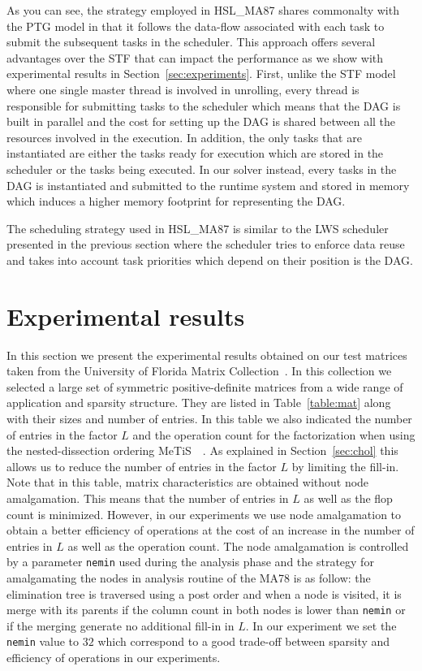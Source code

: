 \documentclass{article}
\newcommand{\alert}[1]{\textcolor{red}{#1}\xspace}
\newcommand{\ma}{HSL\_MA87\xspace}
\newcommand{\lsection}[1]{\section{#1} \setcounter{equation}{0} \setcounter{figure}{0} \setcounter{table}{0} \label{#1}}
\newcommand{\metis}{{\sc Me$\!$T$\!$iS\ }}
\begin{document}
As you can see, the strategy employed in \ma shares commonalty with
the PTG model in that it follows the data-flow associated with each
task to submit the subsequent tasks in the scheduler. This approach
offers several advantages over the STF that can impact the performance
as we show with experimental results in
Section~\ref{sec:experiments}. First, unlike the STF model where one
single master thread is involved in unrolling, every thread is
responsible for submitting tasks to the scheduler which means that the
DAG is built in parallel and the cost for setting up the DAG is shared
between all the resources involved in the execution. In addition, the
only tasks that are instantiated are either the tasks ready for
execution which are stored in the scheduler or the tasks being
executed. In our solver instead, every tasks in the DAG is
instantiated and submitted to the runtime system and stored in memory
which induces a higher memory footprint for representing the DAG.

The scheduling strategy used in \ma is similar to the LWS scheduler
presented in the previous section where the scheduler tries to enforce
data reuse and takes into account task priorities which depend on
their position is the DAG.


\lsection{Experimental results}\label{sec:experiments}

In this section we present the experimental results obtained on our
test matrices taken from the University of Florida Matrix
Collection~\cite{d.h:11}. In this collection we selected a large set
of symmetric positive-definite matrices from a wide range of
application and sparsity structure. They are listed in
Table~\ref{table:mat} along with their sizes and number of entries. In
this table we also indicated the number of entries in the factor $L$
and the operation count for the factorization when using the
nested-dissection ordering \metis~\cite{k.k:98}. As explained in
Section~\ref{sec:chol} this allows us to reduce the number of entries
in the factor $L$ by limiting the fill-in. Note that in this table,
matrix characteristics are obtained without node amalgamation. This
means that the number of entries in $L$ as well as the flop count is
minimized. However, in our experiments we use node amalgamation to
obtain a better efficiency of operations at the cost of an increase in
the number of entries in $L$ as well as the operation count. The node
amalgamation is controlled by a parameter \texttt{nemin} used during
the analysis phase and the strategy for amalgamating the nodes in
analysis routine of the MA78 is as follow: the elimination tree is
traversed using a post order and when a node is visited, it is merge
with its parents if the column count in both nodes is lower than
\texttt{nemin} or if the merging generate no additional fill-in in
$L$. In our experiment we set the \texttt{nemin} value to $32$ which
correspond to a good trade-off between sparsity and efficiency of
operations in our experiments.
\end{document}
